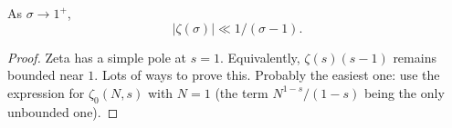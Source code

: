 \begin{lemma}
\label{ZetaNear1BndFilter}
\leanok
As $\sigma\to1^+$,
  $$
  |\zeta(\sigma)| \ll 1/(\sigma-1).
  $$
\end{lemma}
\begin{proof}
\leanok
Zeta has a simple pole at $s=1$. Equivalently, $\zeta(s)(s-1)$ remains bounded near $1$.
  Lots of ways to prove this.
  Probably the easiest one: use the expression for $\zeta_0 (N,s)$ with $N=1$ (the term $N^{1-s}/(1-s)$ being the only unbounded one).
\end{proof}
